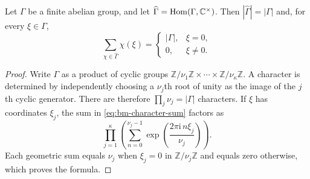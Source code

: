 \begin{lemma}\label{lem:bm-characters}
Let $\Gamma$ be a finite abelian group, and let
$\widehat\Gamma=\operatorname{Hom}(\Gamma,\mathbb C^\times)$. Then
$|\widehat\Gamma|=|\Gamma|$ and, for every $\xi\in\Gamma$,
\begin{equation}\label{eq:bm-character-sum}
\sum_{\chi\in\widehat\Gamma}\chi(\xi)=
\begin{cases}
|\Gamma|,&\xi=0,\\
0,&\xi\ne0.
\end{cases}
\end{equation}
\end{lemma}
\begin{proof}
Write $\Gamma$ as a product of cyclic groups
$\mathbb Z/\nu_1\mathbb Z\times\cdots\times\mathbb Z/\nu_\kappa\mathbb Z$.
A character is determined by independently choosing a $\nu_j$th root
of unity as the image of the $j$th cyclic generator. There are
therefore $\prod_j\nu_j=|\Gamma|$ characters. If $\xi$ has coordinates
$\xi_j$, the sum in \eqref{eq:bm-character-sum} factors as
\[
\prod_{j=1}^{\kappa}\left(\sum_{n=0}^{\nu_j-1}
\exp\!\left(\frac{2\pi\mathrm i\,n\xi_j}{\nu_j}\right)\right).
\]
Each geometric sum equals $\nu_j$ when $\xi_j=0$ in
$\mathbb Z/\nu_j\mathbb Z$ and equals zero otherwise, which proves the
formula.
\end{proof}


